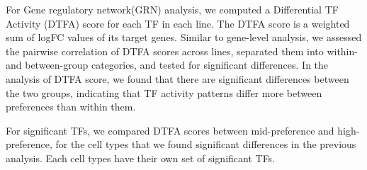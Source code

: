 \documentclass[11pt]{article}
\begin{document}
For Gene regulatory network(GRN) analysis, we computed a Differential TF Activity (DTFA) score for each TF in each line.
The DTFA score is a weighted sum of logFC values of its target genes.
Similar to gene-level analysis, we assessed the pairwise correlation of DTFA scores across lines,
separated them into within- and between-group categories, and tested for significant differences.
In the analysis of DTFA score, we found that there are significant differences between the two groups,
indicating that TF activity patterns differ more between preferences than within them.

For significant TFs, we compared DTFA scores between mid-preference and high-preference, for the cell types that we found significant differences in the previous analysis.
Each cell types have their own set of significant TFs.
\end{document}
